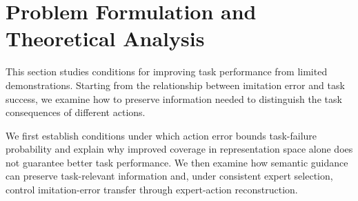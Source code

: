 \section{Problem Formulation and Theoretical Analysis}
\label{sec:analysis}

This section studies conditions for improving task performance from limited demonstrations. 
Starting from the relationship between imitation error and task success, we examine how to preserve information needed to distinguish the task consequences of different actions. 

We first establish conditions under which action error bounds task-failure probability 
and explain why improved coverage in representation space alone does not guarantee better task performance. 
We then examine how semantic guidance can preserve task-relevant information
and, under consistent expert selection, control imitation-error transfer through expert-action reconstruction.




